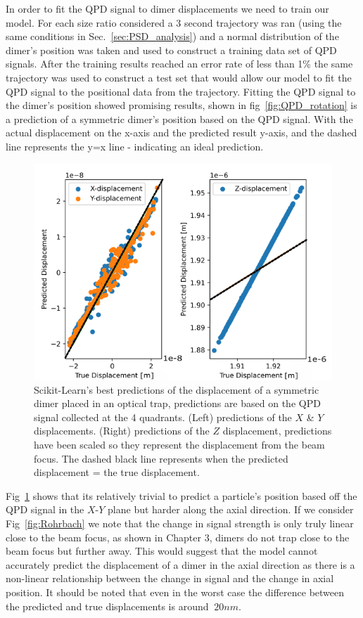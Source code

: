 In order to fit the QPD signal to dimer displacements we need
to train our model. For each size ratio considered a 3 second
trajectory was ran (using the same conditions in 
Sec.~\ref{sec:PSD_analysis}) and a normal distribution of the 
dimer's position was taken and used to construct a training 
data set of QPD signals. After the training results reached an
error rate of less than 1\% the same trajectory was used to
construct a test set that would allow our model to fit the QPD 
signal to the positional data from the trajectory. Fitting the 
QPD signal to the dimer's position showed promising results, 
shown in fig~\ref{fig:QPD_rotation} is a prediction of a 
symmetric dimer's position based on the QPD signal. With the 
actual displacement on the x-axis and the predicted result y-axis, 
and the dashed line represents the y=x line - indicating an 
ideal prediction. 
\begin{figure}[h!]
	\centering
	\includegraphics[width=0.9\linewidth]{predicted_displacements.png}
	\caption{Scikit-Learn's best predictions of the displacement 
		of a symmetric dimer placed in an optical trap, predictions 
		are based on the QPD signal collected at the 4 quadrants. 
		(Left) predictions of the $X$ \& $Y$ displacements. 
		(Right) predictions of the $Z$ displacement, predictions 
		have been scaled so they represent the displacement from 
		the beam focus. The dashed black line represents when the 
		predicted displacement = the true displacement.}
	\label{fig:predicted_displacements}
\end{figure}

Fig~\ref{fig:predicted_displacements} shows that its relatively 
trivial to predict a particle's position based off the QPD signal
in the $X$-$Y$ plane but harder along the axial direction. If we 
consider Fig~\ref{fig:Rohrbach} we note that the change in signal
strength is only truly linear close to the beam focus, as shown in
Chapter 3, dimers do not trap close to the beam focus but further 
away. This would suggest that the model cannot accurately predict 
the displacement of a dimer in the axial direction as there is a 
non-linear relationship between the change in signal and the change 
in axial position. It should be noted that even in the worst case 
the difference between the predicted and true displacements is 
around $~20 nm$. 

